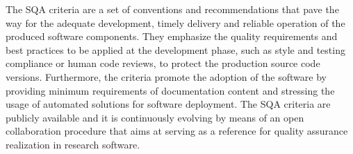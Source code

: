 The SQA criteria are a set of conventions and recommendations that pave the way for
the adequate development, timely delivery and reliable operation of the produced software components.
They emphasize the quality requirements and best practices to be applied at the
development phase, such as style and testing compliance or human code reviews, to protect the
production source code versions. Furthermore, the criteria promote the adoption of the software
by providing minimum requirements of documentation content and stressing the usage of automated
solutions for software deployment. The SQA criteria are publicly available \cite{sqa-baseline} and
it is continuously evolving by means of an open collaboration procedure \cite{sqa-baseline-repo}
that aims at serving as a reference for quality assurance realization in research software.

